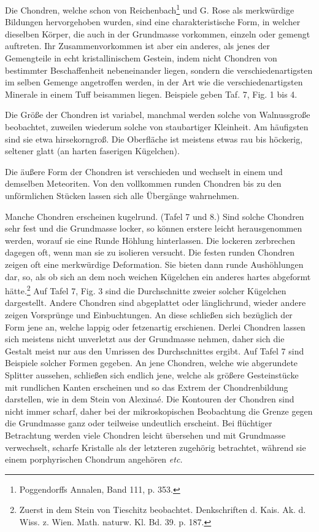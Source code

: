 \documentclass[a4paper, 11pt, oneside, polutonikogreek, german]{article}
\begin{document}
Die Chondren, welche schon von Reichenbach\footnote{Poggendorffs Annalen, Band 111, p. 353.} und G. Rose als merkwürdige Bildungen hervorgehoben wurden, sind eine charakteristische Form, in welcher dieselben Körper, die auch in der Grundmasse vorkommen, einzeln oder gemengt auftreten. Ihr Zusammenvorkommen ist aber ein anderes, als jenes der Gemengteile in echt kristallinischem Gestein, indem nicht Chondren von bestimmter Beschaffenheit nebeneinander liegen, sondern die verschiedenartigsten im selben Gemenge angetroffen werden, in der Art wie die verschiedenartigsten Minerale in einem Tuff beisammen liegen. Beispiele geben Taf. 7, Fig. 1 bis 4.

Die Größe der Chondren ist variabel, manchmal werden solche von Walnussgroße beobachtet, zuweilen wiederum solche von staubartiger Kleinheit. Am häufigsten sind sie etwa hirsekorngroß. Die Oberfläche ist meistens etwas rau bis höckerig, seltener glatt (an harten faserigen Kügelchen).

Die äußere Form der Chondren ist verschieden und wechselt in einem und demselben Meteoriten. Von den vollkommen runden Chondren bis zu den unförmlichen Stücken lassen sich alle Übergänge wahrnehmen.

Manche Chondren erscheinen kugelrund. (Tafel 7 und 8.) Sind solche Chondren sehr fest und die Grundmasse locker, so können erstere leicht herausgenommen werden, worauf sie eine Runde Höhlung hinterlassen. Die lockeren zerbrechen dagegen oft, wenn man sie zu isolieren versucht. Die festen runden Chondren zeigen oft eine merkwürdige Deformation. Sie bieten dann runde Aushöhlungen dar, so, als ob sich an dem noch weichen Kügelchen ein anderes hartes abgeformt hätte.\footnote{Zuerst in dem Stein von Tieschitz beobachtet. Denkschriften d. Kais. Ak. d. Wiss. z. Wien. Math. naturw. Kl. Bd. 39. p. 187.} Auf Tafel 7, Fig. 3 sind die Durchschnitte zweier solcher Kügelchen dargestellt. Andere Chondren sind abgeplattet oder länglichrund, wieder andere zeigen Vorsprünge und Einbuchtungen. An diese schließen sich bezüglich der Form jene an, welche lappig oder fetzenartig erschienen. Derlei Chondren lassen sich meistens nicht unverletzt aus der Grundmasse nehmen, daher sich die Gestalt meist nur aus den Umrissen des Durchschnittes ergibt. Auf Tafel 7 sind Beispiele solcher Formen gegeben. An jene Chondren, welche wie abgerundete Splitter aussehen, schließen sich endlich jene, welche als größere Gesteinstücke mit rundlichen Kanten erscheinen und so das Extrem der Chondrenbildung darstellen, wie in dem Stein von Alexinaé. Die Kontouren der Chondren sind nicht immer scharf, daher bei der mikroskopischen Beobachtung die Grenze gegen die Grundmasse ganz oder teilweise undeutlich erscheint. Bei flüchtiger Betrachtung werden viele Chondren leicht übersehen und mit Grundmasse verwechselt, scharfe Kristalle als der letzteren zugehörig betrachtet, während sie einem porphyrischen Chondrum angehören \emph{etc.}
\end{document}

